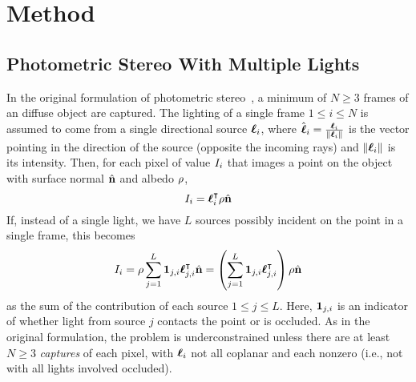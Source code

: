 \section{Method}\label{sec:technical}
\subsection{Photometric Stereo With Multiple Lights}
In the original formulation of photometric stereo~\cite{woodham1979}, a minimum
of $N \ge 3$ frames of an diffuse object are captured. The lighting of a single
frame $1 \le i \le N$ is assumed to come from a single directional source
$\boldsymbol{\ell}_i$, where $\hat{\boldsymbol{\ell}}_i = \frac{\boldsymbol{\ell}_i}{\|\boldsymbol{\ell}_i\|}$ is the
vector pointing in the direction of the source (opposite the incoming rays) and
$\|\boldsymbol{\ell}_i\|$ is its intensity. Then, for each pixel of value $I_i$ that
images a point on the object with surface normal $\hat{\mathbf{n}}$ and albedo
$\rho$,
\begin{equation}
  I_i = \boldsymbol{\ell}_i^\intercal \rho \hat{\mathbf{n}}
\end{equation}
If, instead of a single light, we have $L$ sources possibly incident on the
point in a single frame, this becomes
\begin{equation} \label{eq:photometric-stereo}
  I_i = \rho \sum_{j = 1}^L \mathbf{1}_{j, i} \boldsymbol{\ell}_{j, i}^\intercal \hat{\mathbf{n}}
           = \left(\sum_{j = 1}^L \mathbf{1}_{j, i} \boldsymbol{\ell}_{j, i}^\intercal\right) \rho \hat{\mathbf{n}}
\end{equation}
as the sum of the contribution of each source $1 \le j \le L$. Here,
$\mathbf{1}_{j, i}$ is an indicator of whether light from source $j$ contacts the
point or is occluded. As in the original formulation, the problem is
underconstrained unless there are at least $N \ge 3$ \emph{captures} of each
pixel, with $\boldsymbol{\ell}_i$ not all coplanar and each nonzero (i.e., not with all
lights involved occluded). 

